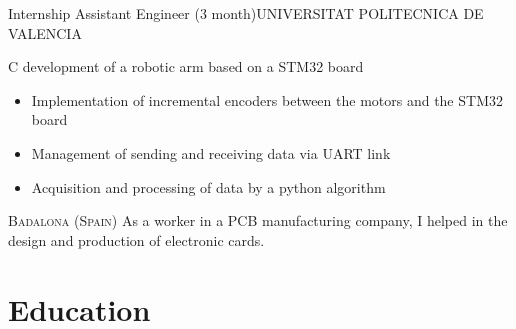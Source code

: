\documentclass[10pt,a4paper]{moderncv}
\begin{document}
{Internship Assistant Engineer (3 month)}{UNIVERSITAT POLITECNICA DE VALENCIA }
{}{}
{ C development of a robotic arm based on a STM32 board
\begin{itemize}
\item{Implementation of incremental encoders between the motors and the STM32 board}
\item{Management of sending and receiving data via UART link}
\item{Acquisition and processing of data by a python algorithm}
\end{itemize}
}


{\textsc{Badalona (Spain)}}{}
{ As a worker in a PCB manufacturing company, I helped in the design and production of electronic cards.
}


\section{Education}
\end{document}
